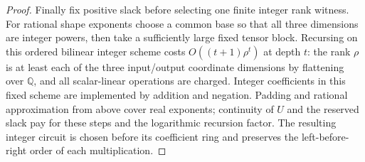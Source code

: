\begin{proof}
Finally fix positive slack before selecting one finite integer
rank witness.  For rational shape exponents choose a common
base so that all three dimensions are integer powers, then
take a sufficiently large fixed tensor block.  Recursing on
this ordered bilinear integer scheme costs
$O((t+1)\rho^t)$ at depth $t$: the rank $\rho$ is at least
each of the three input/output coordinate dimensions by
flattening over $\mathbb Q$, and all scalar-linear operations
are charged.  Integer coefficients in this fixed scheme are
implemented by addition and negation.  Padding and rational
approximation from above cover real exponents; continuity of
$U$ and the reserved slack pay for these steps and the
logarithmic recursion factor.  The resulting integer circuit
is chosen before its coefficient ring and preserves the
left-before-right order of each multiplication.
\end{proof}
